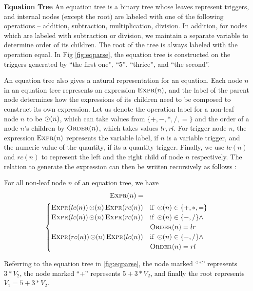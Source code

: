   \noindent \textbf{Equation Tree} An equation tree is a binary tree
  whose leaves represent triggers, and internal nodes (except the
  root) are labeled with one of the following operations -- addition,
  subtraction, multiplication, division. In addition, for nodes which
  are labeled with subtraction or division, we maintain a separate
  variable to determine order of its children. The root of the tree is
  always labeled with the operation equal. In Fig \ref{fig:eqparse},
  the equation tree is constructed on the triggers generated by ``the
  first one'', ``5'', ``thrice'', and ``the second''. 

  An equation tree also gives a natural representation for an
  equation. Each node $n$ in an equation tree represents an expression
  $\operatorname{\textsc{Expr}}(n)$, and the label of the parent node determines how the
  expressions of its children need to be composed to construct its own
  expression. Let us denote the operation label for a non-leaf node
  $n$ to be $\operatorname{\odot}(n)$, which can take values from $\{+, -, *, /, =\}$
  and the order of a node $n$'s children by $\operatorname{\textsc{Order}}(n)$, which takes
  values ${lr, rl}$. For trigger node $n$, the expression $\operatorname{\textsc{Expr}}(n)$
  represents the variable label, if $n$ is a variable trigger, and the
  numeric value of the quantity, if its a quantity trigger. Finally,
  we use $lc(n)$ and $rc(n)$ to represent the left and the right child
  of node $n$ respectively. The relation to generate the expression
  can then be wriiten recursively as follows :
  
  For all non-leaf node $n$ of an equation tree, we have
  \begin{multline}
    \operatorname{\textsc{Expr}}(n) = \\
    \begin{cases}
    \operatorname{\textsc{Expr}}(lc(n)) \operatorname{\odot}(n) \operatorname{\textsc{Expr}}(rc(n)) & \mbox{if } \operatorname{\odot}(n) \in \{+,*, =\} \\
    \operatorname{\textsc{Expr}}(lc(n)) \operatorname{\odot}(n) \operatorname{\textsc{Expr}}(rc(n)) &  \mbox{if } \operatorname{\odot}(n) \in \{-,/\} \wedge\\
    & \operatorname{\textsc{Order}}(n)=lr \\
    \operatorname{\textsc{Expr}}(rc(n)) \operatorname{\odot}(n) \operatorname{\textsc{Expr}}(lc(n)) &  \mbox{if } \operatorname{\odot}(n) \in \{-,/\} \wedge\\
    & \operatorname{\textsc{Order}}(n)=rl \\
    \end{cases}
  \end{multline}

  Referring to the equation tree in \ref{fig:eqparse}, the node marked
  ``*'' represents $3*V_2$, the node marked ``+'' represents
  $5+3*V_2$, and finally the root represents $V_1=5+3*V_2$.
  
